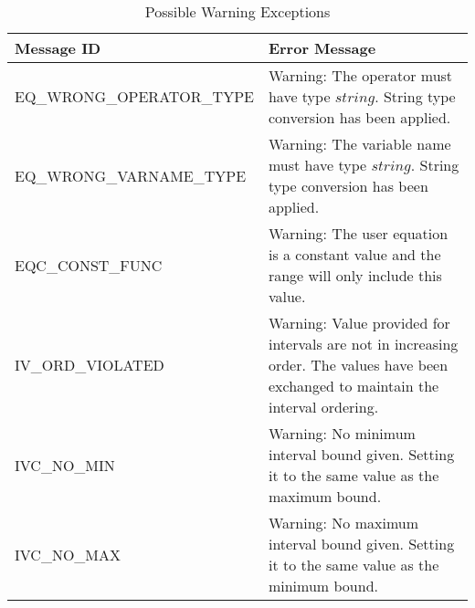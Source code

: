 \documentclass[12pt, titlepage]{article}
\begin{document}
\begin{longtable}{l p{9.5cm}}
	\caption{Possible Warning Exceptions} \\
	\toprule
	\textbf{Message ID} & \textbf{Error Message} \\
	\midrule
	EQ\_WRONG\_OPERATOR\_TYPE & Warning: The operator must have type $string$. 
	String type conversion has been applied.\\
	EQ\_WRONG\_VARNAME\_TYPE & Warning: The variable name must have type 
	$string$. String type conversion has been applied. \\
	EQC\_CONST\_FUNC & Warning: The user equation is a constant value and the 
	range will only include this value.\\
	IV\_ORD\_VIOLATED & Warning: Value provided for intervals are not in 
	increasing order. The values have been exchanged to maintain the interval 
	ordering. \\
	IVC\_NO\_MIN & Warning: No minimum interval bound given. Setting it to the 
	same value as the maximum bound. \\
	IVC\_NO\_MAX & Warning: No maximum interval bound given. Setting it to the 
	same value as the minimum bound. \\
	\bottomrule
\end{longtable}
\end{document}
